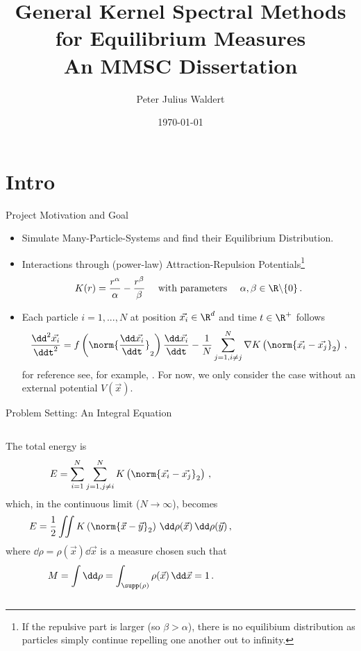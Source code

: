 \documentclass[aspectratio=169, hyperref={colorlinks=true}]{beamer}
\title{General Kernel Spectral Methods for Equilibrium Measures \\ \normalsize An MMSC Dissertation}
\author{Peter Julius Waldert}
\institute{Mathematical Institute \\ University of Oxford}
\date{\today}
\begin{document}
  {\frame{\titlepage}}

  \section{Intro}
   {
    \begin{frame}{Project Motivation and Goal}
      \vspace{0.4cm}
      \begin{itemize}
        \item Simulate Many-Particle-Systems and find their Equilibrium Distribution.
        \item Interactions through (power-law) Attraction-Repulsion Potentials\footnote{If the repulsive part is larger (so $\beta > \alpha$), there is no equilibium distribution as particles simply continue repelling one another out to infinity.}
              $$K(r) = \frac{r^\alpha}{\alpha} - \frac{r^\beta}{\beta}\quad \text{ with parameters } \quad \alpha, \beta \in \R \backslash \{0\}\,.$$
        \item Each particle $i=1, ..., N$ at position $\vec{x_i} \in \R^d$ and time $t \in \R^+$ follows
              $$\frac{\dd^2 \vec{x_i}}{\ddt^2} = f\left(\norm{\frac{\dd \vec{x_i}}{\ddt}}_2\right) \frac{\dd\vec{x_i}}{\ddt} - \frac{1}{N} \sum_{j=1, i\neq j}^{N} \nabla K\left(\norm{\vec{x_i} - \vec{x_j}}_2\right)\,,$$
              for reference see, for example, \parencite{2020-power-law-kernels, 2021-arbitrary-dimensions}.
              For now, we only consider the case without an external potential $V(\vec{x})$.
      \end{itemize}
    \end{frame}
   }

  \begin{frame}{Problem Setting: An Integral Equation}
    \vspace{0.4cm}
    \begin{columns}
      \begin{column}{0.7\textwidth}
        The total energy is $$E = \sum_{i=1}^{N} \sum_{j=1, j \neq i}^{N} K\left(\norm{\vec{x_i} - \vec{x_j}}_2\right)\,,$$
        which, in the continuous limit ($N \rightarrow \infty$), becomes
        $$E = \frac{1}{2} \iint K\left(\norm{\vec{x} - \vec{y}}_2\right) \,\dd\rho(\vec{x})\,\dd\rho(\vec{y})\,,$$ where $\dd\rho = \rho(\vec{x})\dd\vec{x}$ is a measure chosen such that $$M = \int \dd\rho = \int_{\supp(\rho)} \rho(\vec{x}) \,\dd\vec{x} = 1\,.$$
      \end{column}
      \begin{column}{0.3\textwidth}
        \begin{figure}[H]
          \hspace*{-1.8cm}
          \centering
        \end{figure}
      \end{column}
    \end{columns}
  \end{frame}
\end{document}
